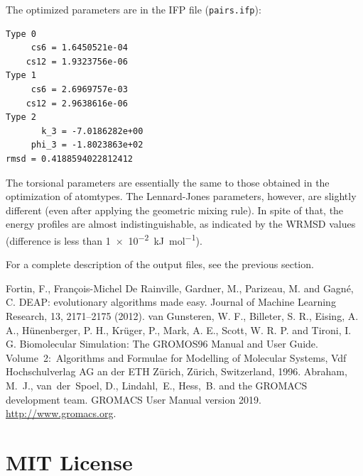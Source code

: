 \documentclass[10pt,a4paper,openany]{memoir}
\numberwithin{equation}{section}
\begin{document}
The optimized parameters are in the IFP file (\texttt{pairs.ifp}):

\begin{lstlisting}[language=gromacs]
Type 0
     cs6 = 1.6450521e-04     
    cs12 = 1.9323756e-06     
Type 1
     cs6 = 2.6969757e-03     
    cs12 = 2.9638616e-06     
Type 2
       k_3 = -7.0186282e+00    
     phi_3 = -1.8023863e+02    
rmsd = 0.4188594022812412
\end{lstlisting}\vspace{2ex}\par

\noindent
The torsional parameters are essentially the same to those obtained in
the optimization of atomtypes.  The Lennard-Jones parameters, however,
are slightly different (even after applying the geometric mixing
rule). In spite of that, the energy profiles are almost
indistinguishable, as indicated by the WRMSD values (difference is
less than \SI{1e-2}{\kJ\per\mole}).

For a complete description of the output files, see the previous
section.

\begin{thebibliography}{9}
    Fortin, F., Fran\c{c}ois-Michel De Rainville, Gardner, M., Parizeau, M. and Gagn\'e, C. DEAP: evolutionary algorithms made easy. Journal of Machine Learning Research, 13, 2171–2175 (2012). 
 van Gunsteren, W. F., Billeter, S. R., Eising,
  A. A., Hünenberger, P. H., Krüger, P., Mark, A. E., Scott,
  W. R. P. and Tironi, I. G. Biomolecular Simulation: The GROMOS96
  Manual and User Guide. Volume~2:~Algorithms and Formulae for
  Modelling of Molecular Systems, Vdf Hochschulverlag AG an der ETH
  Zürich, Zürich, Switzerland, 1996.
 Abraham, M.~J., van~der~Spoel, D., Lindahl,~E.,
  Hess,~B. and the GROMACS development team. GROMACS User Manual
  version 2019. \url{http://www.gromacs.org}.
\end{thebibliography}

\appendix
\chapter{MIT License}
\label{appendix:MIT-license}
\end{document}
